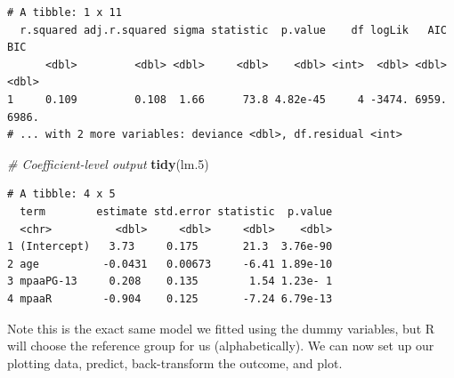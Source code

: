 \documentclass[]{book}
\newenvironment{Shaded}{\begin{snugshade}}{\end{snugshade}}
\newcommand{\CommentTok}[1]{\textcolor[rgb]{0.56,0.35,0.01}{\textit{#1}}}
\newcommand{\DataTypeTok}[1]{\textcolor[rgb]{0.13,0.29,0.53}{#1}}
\newcommand{\DecValTok}[1]{\textcolor[rgb]{0.00,0.00,0.81}{#1}}
\newcommand{\FloatTok}[1]{\textcolor[rgb]{0.00,0.00,0.81}{#1}}
\newcommand{\KeywordTok}[1]{\textcolor[rgb]{0.13,0.29,0.53}{\textbf{#1}}}
\newcommand{\NormalTok}[1]{#1}
\newcommand{\OperatorTok}[1]{\textcolor[rgb]{0.81,0.36,0.00}{\textbf{#1}}}
\newcommand{\StringTok}[1]{\textcolor[rgb]{0.31,0.60,0.02}{#1}}
\begin{document}
\begin{verbatim}
# A tibble: 1 x 11
  r.squared adj.r.squared sigma statistic  p.value    df logLik   AIC   BIC
      <dbl>         <dbl> <dbl>     <dbl>    <dbl> <int>  <dbl> <dbl> <dbl>
1     0.109         0.108  1.66      73.8 4.82e-45     4 -3474. 6959. 6986.
# ... with 2 more variables: deviance <dbl>, df.residual <int>
\end{verbatim}

\begin{Shaded}
\begin{Highlighting}[]
\CommentTok{# Coefficient-level output}
\KeywordTok{tidy}\NormalTok{(lm}\FloatTok{.5}\NormalTok{)}
\end{Highlighting}
\end{Shaded}

\begin{verbatim}
# A tibble: 4 x 5
  term        estimate std.error statistic  p.value
  <chr>          <dbl>     <dbl>     <dbl>    <dbl>
1 (Intercept)   3.73     0.175       21.3  3.76e-90
2 age          -0.0431   0.00673     -6.41 1.89e-10
3 mpaaPG-13     0.208    0.135        1.54 1.23e- 1
4 mpaaR        -0.904    0.125       -7.24 6.79e-13
\end{verbatim}

Note this is the exact same model we fitted using the dummy variables, but R will choose the reference group for us (alphabetically). We can now set up our plotting data, predict, back-transform the outcome, and plot.

\begin{Shaded}
\end{Shaded}
\end{document}
